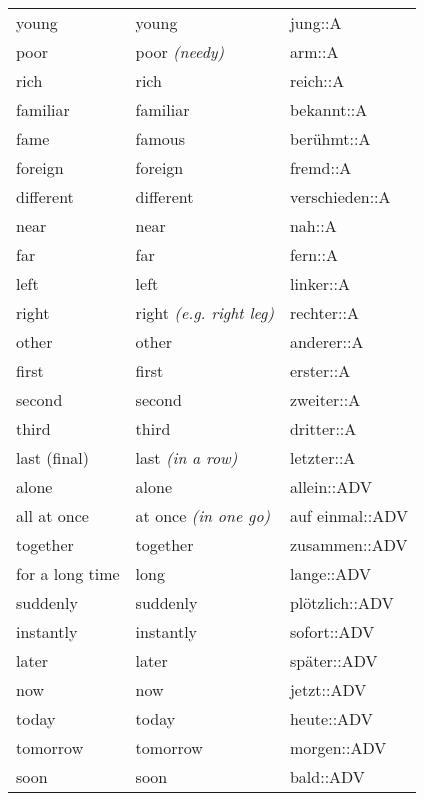 \begin{center}
\begin{longtable}{lll}
{\sc \lowercase{	YOUNG	}}	&	young		&	jung::A	\\
{\sc \lowercase{	POOR	}}	&	poor	\textit{\footnotesize (needy)}	&	arm::A	\\
{\sc \lowercase{	RICH	}}	&	rich		&	reich::A	\\
{\sc \lowercase{	FAMILIAR	}}	&	familiar		&	bekannt::A	\\
{\sc \lowercase{	FAME	}}	&	famous		&	berühmt::A	\\
{\sc \lowercase{	FOREIGN	}}	&	foreign		&	fremd::A	\\
{\sc \lowercase{	DIFFERENT	}}	&	different		&	verschieden::A	\\
{\sc \lowercase{	NEAR	}}	&	near		&	nah::A	\\
{\sc \lowercase{	FAR	}}	&	far		&	fern::A	\\
{\sc \lowercase{	LEFT	}}	&	left		&	linker::A	\\
{\sc \lowercase{	RIGHT	}}	&	right	\textit{\footnotesize (e.g. right leg)}	&	rechter::A	\\
{\sc \lowercase{	OTHER	}}	&	other		&	anderer::A	\\
{\sc \lowercase{	FIRST	}}	&	first		&	erster::A	\\
{\sc \lowercase{	SECOND	}}	&	second		&	zweiter::A	\\
{\sc \lowercase{	THIRD	}}	&	third		&	dritter::A	\\
{\sc \lowercase{	LAST \footnotesize (FINAL)	}}	&	last	\textit{\footnotesize (in a row)}	&	letzter::A	\\
{\sc \lowercase{	ALONE	}}	&	alone		&	allein::ADV	\\
{\sc \lowercase{	ALL AT ONCE	}}	&	at once	\textit{\footnotesize (in one go)}	&	auf einmal::ADV	\\
{\sc \lowercase{	TOGETHER	}}	&	together		&	zusammen::ADV	\\
{\sc \lowercase{	FOR A LONG TIME	}}	&	long		&	lange::ADV	\\
{\sc \lowercase{	SUDDENLY	}}	&	suddenly		&	plötzlich::ADV	\\
{\sc \lowercase{	INSTANTLY	}}	&	instantly		&	sofort::ADV	\\
{\sc \lowercase{	LATER	}}	&	later		&	später::ADV	\\
{\sc \lowercase{	NOW	}}	&	now		&	jetzt::ADV	\\
{\sc \lowercase{	TODAY	}}	&	today		&	heute::ADV	\\
{\sc \lowercase{	TOMORROW	}}	&	tomorrow		&	morgen::ADV	\\
{\sc \lowercase{	SOON	}}	&	soon		&	bald::ADV	\\

\end{longtable}
\end{center}
